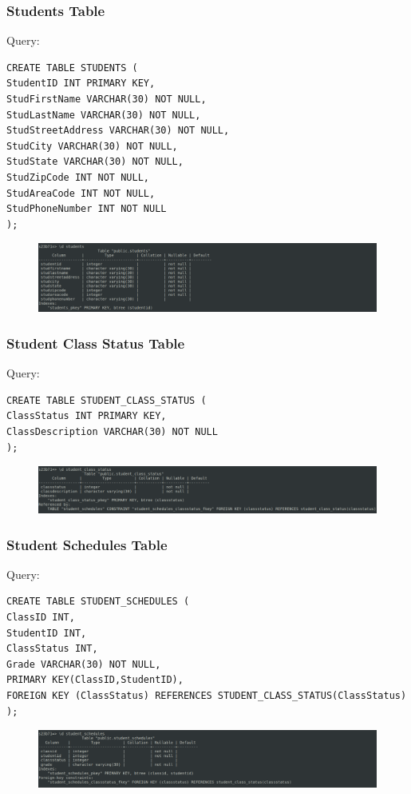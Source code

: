 \documentclass{article}
\begin{document}
\subsubsection*{Students Table}
Query:
\begin{Verbatim}[frame=single,framerule=1pt,fontfamily=courier,fontsize=\small]
CREATE TABLE STUDENTS (
StudentID INT PRIMARY KEY,
StudFirstName VARCHAR(30) NOT NULL,
StudLastName VARCHAR(30) NOT NULL,
StudStreetAddress VARCHAR(30) NOT NULL,
StudCity VARCHAR(30) NOT NULL,
StudState VARCHAR(30) NOT NULL,
StudZipCode INT NOT NULL,
StudAreaCode INT NOT NULL,
StudPhoneNumber INT NOT NULL
);
\end{Verbatim}
\begin{figure}[H]
    \centering
    \includegraphics[width=\textwidth]{schema/students.png}
\end{figure}

\subsubsection*{Student Class Status Table}
Query:
\begin{Verbatim}[frame=single,framerule=1pt,fontfamily=courier,fontsize=\small]
CREATE TABLE STUDENT_CLASS_STATUS (
ClassStatus INT PRIMARY KEY,
ClassDescription VARCHAR(30) NOT NULL
);
\end{Verbatim}
\begin{figure}[H]
    \centering
    \includegraphics[width=\textwidth]{schema/student_class_status.png}
\end{figure}

\subsubsection*{Student Schedules Table}
Query:
\begin{Verbatim}[frame=single,framerule=1pt,fontfamily=courier,fontsize=\small]
CREATE TABLE STUDENT_SCHEDULES (
ClassID INT,
StudentID INT,
ClassStatus INT,
Grade VARCHAR(30) NOT NULL,
PRIMARY KEY(ClassID,StudentID),
FOREIGN KEY (ClassStatus) REFERENCES STUDENT_CLASS_STATUS(ClassStatus)
);
\end{Verbatim}
\begin{figure}[H]
    \centering
    \includegraphics[width=\textwidth]{schema/student_schedules.png}
\end{figure}
\end{document}
